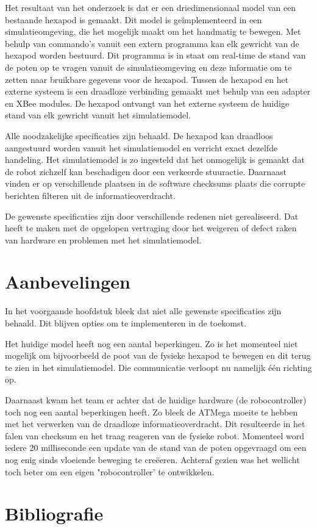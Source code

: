 \documentclass[10pt,a4paper]{article}
\begin{document}
Het resultaat van het onderzoek is dat er een driedimensionaal model van een bestaande hexapod is gemaakt. Dit model is ge\"implementeerd in een simulatieomgeving, die het mogelijk maakt om het handmatig te bewegen. Met behulp van commando's vanuit een extern programma kan elk gewricht van de hexapod worden bestuurd. Dit programma is in staat om real-time de stand van de poten op te vragen vanuit de simulatieomgeving en deze informatie om te zetten naar bruikbare gegevens voor de hexapod. Tussen de hexapod en het externe systeem is een draadloze verbinding gemaakt met behulp van een adapter en XBee modules. De hexapod ontvangt van het externe systeem de huidige stand van elk gewricht vanuit het simulatiemodel.

Alle noodzakelijke specificaties zijn behaald. De hexapod kan draadloos aangestuurd worden vanuit het simulatiemodel en verricht exact dezelfde handeling. Het simulatiemodel is zo ingesteld dat het onmogelijk is gemaakt dat de robot zichzelf kan beschadigen door een verkeerde stuuractie. Daarnaast vinden er op verschillende plaatsen in de software checksums plaats die corrupte berichten filteren uit de informatieoverdracht.

De gewenste specificaties zijn door verschillende redenen niet gerealiseerd. Dat heeft te maken met de opgelopen vertraging door het weigeren of defect raken van hardware en problemen met het simulatiemodel.

\newpage
\section{Aanbevelingen}
In het voorgaande hoofdstuk bleek dat niet alle gewenste specificaties zijn behaald. Dit blijven opties om te implementeren in de toekomst. 

Het huidige model heeft nog een aantal beperkingen. Zo is het momenteel niet mogelijk om bijvoorbeeld de poot van de fysieke hexapod te bewegen en dit terug te zien in het simulatiemodel. Die communicatie verloopt nu namelijk \'e\'en richting op. 

Daarnaast kwam het team er achter dat de huidige hardware (de robocontroller) toch nog een aantal beperkingen heeft. Zo bleek de ATMega moeite te hebben met het verwerken van de draadloze informatieoverdracht. Dit resulteerde in het falen van checksum en het traag reageren van de fysieke robot. Momenteel word iedere 20 milliseconde een update van de stand van de poten opgevraagd om een nog enig sinds vloeiende beweging te cre\"eeren. Achteraf gezien was het wellicht toch beter om een eigen "robocontroller' te ontwikkelen.

\newpage

\section{Bibliografie}


\end{document}
